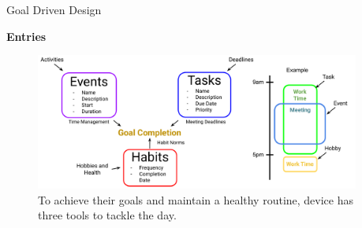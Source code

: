 \documentclass[final]{beamer}
\newlength{\sepwidth}
\newlength{\colwidth}
\newcommand{\separatorcolumn}{\begin{column}{\sepwidth}\end{column}}
\begin{document}
\begin{frame}[t]
\begin{columns}[t]
    \separatorcolumn

    \begin{column}{\colwidth} 

      \begin{block}{Goal Driven Design}

        \textbf{Entries}
        \begin{figure}
          \includegraphics[width = \textwidth]{entry_logic.pdf}
          \caption{To achieve their goals and maintain a healthy routine, device has
        three tools to tackle the day.}
        \end{figure}

      \end{block}


\end{column}
\end{columns}
\end{frame}
\end{document}
